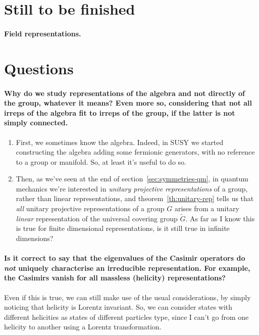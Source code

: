 \section{Still to be finished}
\paragraph{Field representations.}




\section{Questions}
\paragraph{Why do we study representations of the algebra and not directly of the group, whatever it means? Even more so, considering that not all irreps of the algebra fit to irreps of the group, if the latter is not simply connected.}
\begin{enumerate}
    \item First, we sometimes know the algebra. Indeed, in SUSY we started constructing the algebra adding some fermionic generators, with no reference to a group or manifold. So, at least it's useful to do so.
    \item Then, as we've seen at the end of section~\ref{sec:symmetries-qm}, in quantum mechanics we're interested in \emph{unitary projective representations} of a group, rather than linear representations, and theorem~\ref{th:unitary-rep} tells us that \emph{all} unitary projective representations of a group $G$ arises from a unitary \emph{linear} representation of the universal covering group $\tilde{G}$. \color{red} As far as I know this is true for finite dimensional representations, is it still true in infinite dimensions? \color{black}
\end{enumerate}

\paragraph{Is it correct to say that the eigenvalues of the Casimir operators do \emph{not} uniquely characterise an irreducible representation. For example, the Casimirs vanish for all massless (helicity) representations?}

Even if this is true, we can still make use of the usual considerations, by simply noticing that helicity is Lorentz invariant. So, we can consider states with different helicities as states of different particles type, since I can't go from one helicity to another using a Lorentz transformation.

